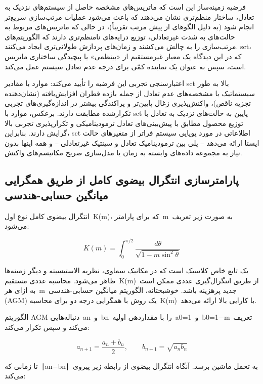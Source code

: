 \documentclass[12pt, a4paper]{article}
\begin{document}
فرضیه زمینه‌ساز این است که ماتریس‌های مشخصه حاصل از سیستم‌های نزدیک به تعادل، ساختار منظم‌تری نشان می‌دهند که باعث می‌شود عملیات مرتب‌سازی سریع‌تر انجام شود (به دلیل الگوهای از پیش مرتب تقریباً)، در حالی که ماتریس‌های مربوط به حالت‌های به شدت غیرتعادلی، توزیع درایه‌های نامنظم‌تری دارند که الگوریتم‌های مرتب‌سازی را به چالش می‌کشند و زمان‌های پردازش طولانی‌تری ایجاد می‌کنند. sct، که در این دیدگاه یک معیار غیرمستقیم از «بینظمی» یا پیچیدگی ساختاری ماتریس است، سپس به عنوان یک نماینده کمّی برای درجه عدم تعادل سیستم عمل می‌کند.

اعتبارسنجی تجربی این فرضیه را تأیید می‌کند: موارد با مقادیر sct بالا به طور سیستماتیک با مشخصه‌های عدم تعادل از جمله بازده قطران افزایش‌یافته (نشان‌دهنده تجزیه ناقص)، واکنش‌پذیری زغال پایین‌تر و پراکندگی بیشتر در اندازه‌گیری‌های تجربی تکرارشده مطابقت دارند. برعکس، موارد با sct پایین به حالت‌های نزدیک به تعادل با توزیع محصول مطابق با پیش‌بینی‌های تعادل ترمودینامیکی و تکرارپذیری تجربی بالا گرایش دارند. بنابراین، sct اطلاعاتی در مورد پویایی سیستم فراتر از متغیرهای حالت ایستا ارائه می‌دهد – پلی بین ترمودینامیک تعادل و سینتیک غیرتعادلی – و همه اینها بدون نیاز به مجموعه داده‌های وابسته به زمان یا مدل‌سازی صریح مکانیسم‌های واکنش.

\subsection{پارامترسازی انتگرال بیضوی کامل از طریق همگرایی میانگین حسابی-هندسی}

انتگرال بیضوی کامل نوع اول K(m)، که برای پارامتر m به صورت زیر تعریف می‌شود:

\begin{equation}
K(m)=\int_{0}^{\pi/2}\frac{d\theta}{\sqrt{1-m\sin^{2}\theta}}
\end{equation}

یک تابع خاص کلاسیک است که در مکانیک سماوی، نظریه الاستیسیته و دیگر زمینه‌ها ظاهر می‌شود. محاسبه عددی مستقیم K(m) از طریق انتگرال‌گیری عددی ممکن است به ازای هر m جدید پرهزینه باشد. خوشبختانه، الگوریتم میانگین حسابی-هندسی (AGM) یک روش با همگرایی درجه دو برای محاسبه K(m) با کارایی بالا ارائه می‌دهد.

الگوریتم AGM دنباله‌هایی an و bn را با مقداردهی اولیه a0=1 و b0=1−m تعریف می‌کند و سپس تکرار می‌کند:

\begin{equation}
a_{n+1}=\frac{a_{n}+b_{n}}{2},\qquad b_{n+1}=\sqrt{a_{n}b_{n}}
\end{equation}

تا زمانی که ∣an−bn∣ به تحمل ماشین برسد. آنگاه انتگرال بیضوی از رابطه زیر پیروی می‌کند:
\end{document}
